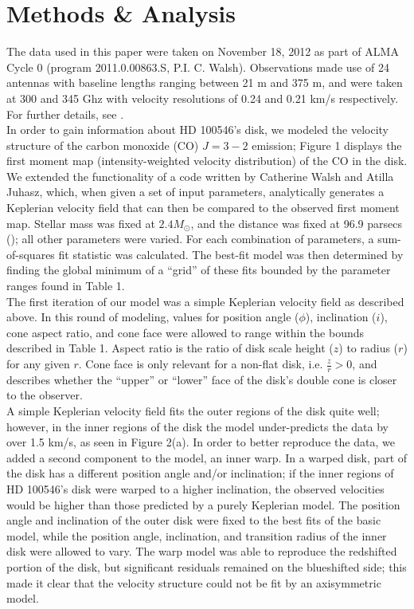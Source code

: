 \documentclass{knac}
\begin{document}
\section{Methods \& Analysis}
The data used in this paper were taken on November 18, 2012 as part of ALMA Cycle 0 (program 2011.0.00863.S, P.I. C. Walsh). Observations made use of 24 antennas with baseline lengths ranging between 21 m and 375 m, and were taken at 300 and 345 Ghz with velocity resolutions of 0.24 and 0.21 km/s respectively. For further details, see \cite{Walsh14}.\\
\indent In order to gain information about HD 100546's disk, we modeled the velocity structure of the carbon monoxide (CO) $J=3-2$ emission; Figure 1 displays the first moment map (intensity-weighted velocity distribution) of the CO in the disk. We extended the functionality of a code written by Catherine Walsh and Atilla Juhasz, which, when given a set of input parameters, analytically generates a Keplerian velocity field that can then be compared to the observed first moment map. Stellar mass was fixed at $2.4M_{\odot}$, and the distance was fixed at 96.9 parsecs (\citealt{Ancker98, Meeus12}); all other parameters were varied. For each combination of parameters, a sum-of-squares fit statistic was calculated. The best-fit model was then determined by finding the global minimum of a ``grid'' of these fits bounded by the parameter ranges found in Table 1.\\
\indent The first iteration of our model was a simple Keplerian velocity field as described above. In this round of modeling, values for position angle ($\phi$), inclination ($i$), cone aspect ratio, and cone face were allowed to range within the bounds described in Table 1. Aspect ratio is the ratio of disk scale height ($z$) to radius ($r$) for any given $r$. Cone face is only relevant for a non-flat disk, i.e. $\frac{z}{r} > 0$, and describes whether the ``upper'' or ``lower'' face of the disk's double cone is closer to the observer.\\
\indent A simple Keplerian velocity field fits the outer regions of the disk quite well; however, in the inner regions of the disk the model under-predicts the data by over 1.5 km/s, as seen in Figure 2(a). In order to better reproduce the data, we added a second component to the model, an inner warp. In a warped disk, part of the disk has a different position angle and/or inclination; if the inner regions of HD 100546's disk were warped to a higher inclination, the observed velocities would be higher than those predicted by a purely Keplerian model. The position angle and inclination of the outer disk were fixed to the best fits of the basic model, while the position angle, inclination, and transition radius of the inner disk were allowed to vary. The warp model was able to reproduce the redshifted portion of the disk, but significant residuals remained on the blueshifted side; this made it clear that the velocity structure could not be fit by an axisymmetric model.\\
\end{document}
